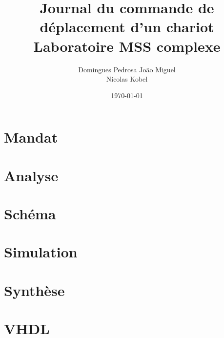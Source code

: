 \documentclass[10pt,a4paper]{article}
\author{Domingues Pedrosa João Miguel \\ Nicolas Kobel}
\title{Journal du commande de déplacement d'un chariot 
\\Laboratoire MSS complexe}
\date{\today}
\begin{document}
\maketitle
\newpage
\tableofcontents
\newpage

\section{Mandat}

\section{Analyse}

\section{Schéma}

\section{Simulation}

\section{Synthèse}

\section{VHDL}
\end{document}

